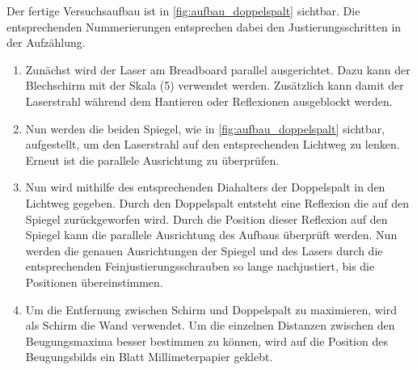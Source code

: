 \documentclass[12pt,english,ngerman]{scrartcl}
\begin{document}
Der fertige Versuchsaufbau ist in \autoref{fig:aufbau_doppelspalt} sichtbar. Die entsprechenden Nummerierungen entsprechen dabei den 
Justierungsschritten in der Aufzählung.

\begin{enumerate}
    \item Zunächst wird der Laser am Breadboard parallel ausgerichtet. Dazu kann der Blechschirm mit der Skala (5) verwendet 
    werden. Zusätzlich kann damit der Laserstrahl während dem Hantieren oder Reflexionen ausgeblockt werden.
    \item Nun werden die beiden Spiegel, wie in \autoref{fig:aufbau_doppelspalt} sichtbar, aufgestellt, um den Laserstrahl 
    auf den entsprechenden Lichtweg zu lenken. Erneut ist die parallele Ausrichtung zu überprüfen.
    \item Nun wird mithilfe des entsprechenden Diahalters der Doppelspalt in den Lichtweg gegeben. Durch den Doppelspalt 
    entsteht eine Reflexion die auf den Spiegel zurückgeworfen wird. Durch die Position dieser Reflexion auf den Spiegel 
    kann die parallele Ausrichtung des Aufbaus überprüft werden. Nun werden die genauen Ausrichtungen der Spiegel und des 
    Lasers durch die entsprechenden Feinjustierungsschrauben so lange nachjustiert, bis die Positionen übereinstimmen.
    \item Um die Entfernung zwischen Schirm und Doppelspalt zu maximieren, wird als Schirm die Wand verwendet. Um die einzelnen 
    Distanzen zwischen den Beugungsmaxima besser bestimmen zu können, wird auf die Position des Beugungsbilds ein Blatt 
    Millimeterpapier geklebt.
\end{enumerate}
\end{document}

